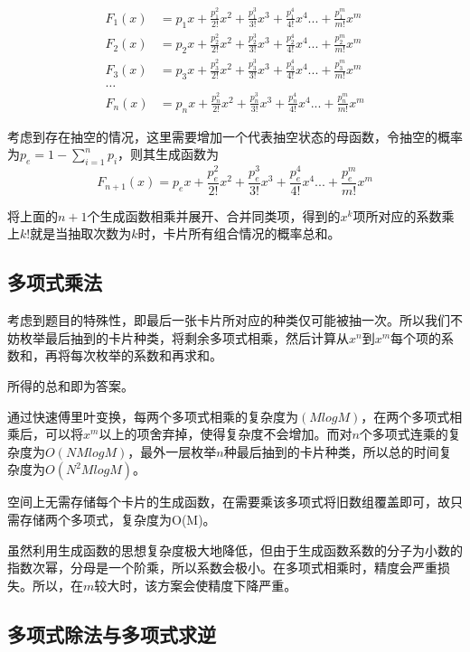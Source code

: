 \documentclass[master]{thesis-uestc}
\begin{document}
$$
\begin{array}{lll}
    

F_1(x) & =p_1x+\frac{p_1^2}{2!}x^2+\frac{p_1^3}{3!}x^3+\frac{p_1^4}{4!}x^4...+\frac{p_1^m}{m!}x^m \\


F_2(x) & =p_2x+\frac{p_2^2}{2!}x^2+\frac{p_2^3}{3!}x^3+\frac{p_2^4}{4!}x^4...+\frac{p_2^m}{m!}x^m \\

F_3(x) & =p_3x+\frac{p_3^2}{2!}x^2+\frac{p_3^3}{3!}x^3+\frac{p_3^4}{4!}x^4...+\frac{p_3^m}{m!}x^m \\

\dots \\

F_n(x) & =p_nx+\frac{p_n^2}{2!}x^2+\frac{p_n^3}{3!}x^3+\frac{p_n^4}{4!}x^4...+\frac{p_n^m}{m!}x^m

\end{array}
$$

考虑到存在抽空的情况，这里需要增加一个代表抽空状态的母函数，令抽空的概率为$p_e=1-\sum\limits_{i=1}^n{p_i}$，则其生成函数为
$$
F_{n+1}(x) =p_ex+\frac{p_e^2}{2!}x^2+\frac{p_e^3}{3!}x^3+\frac{p_e^4}{4!}x^4...+\frac{p_e^m}{m!}x^m
$$


将上面的$n+1$个生成函数相乘并展开、合并同类项，得到的$x^k$项所对应的系数乘上$k!$就是当抽取次数为$k$时，卡片所有组合情况的概率总和。

\subsection{多项式乘法}

考虑到题目的特殊性，即最后一张卡片所对应的种类仅可能被抽一次。所以我们不妨枚举最后抽到的卡片种类，将剩余多项式相乘，然后计算从$x^n$到$x^m$每个项的系数和，再将每次枚举的系数和再求和。

所得的总和即为答案。

通过快速傅里叶变换，每两个多项式相乘的复杂度为$(MlogM)$，在两个多项式相乘后，可以将$x^m$以上的项舍弃掉，使得复杂度不会增加。而对$n$个多项式连乘的复杂度为$O(NMlogM)$，最外一层枚举$n$种最后抽到的卡片种类，所以总的时间复杂度为$O(N^2MlogM)$。

空间上无需存储每个卡片的生成函数，在需要乘该多项式将旧数组覆盖即可，故只需存储两个多项式，复杂度为O(M)。

虽然利用生成函数的思想复杂度极大地降低，但由于生成函数系数的分子为小数的指数次幂，分母是一个阶乘，所以系数会极小。在多项式相乘时，精度会严重损失。所以，在$m$较大时，该方案会使精度下降严重。

\subsection{多项式除法与多项式求逆}
\end{document}
